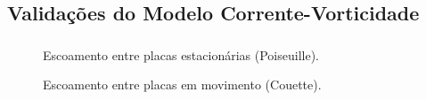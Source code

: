 \documentclass{beamer}
\begin{document}
\subsection{Validações do Modelo Corrente-Vorticidade}
\begin{frame}
  \frametitle{\subsecname}
  
  \begin{minipage}{.60\textwidth}
    \begin{figure}
       {\raggedleft \tiny Escoamento entre placas estacionárias (Poiseuille).}
    \end{figure}
    \vspace*{-\baselineskip}\setlength\belowdisplayshortskip{0pt} %
    \begin{figure}
       {\raggedleft \tiny Escoamento entre placas em movimento (Couette).}
    \end{figure}
  \end{minipage}
  \hfill
  \begin{minipage}{.36\textwidth}

\end{minipage}
\end{frame}
\end{document}
